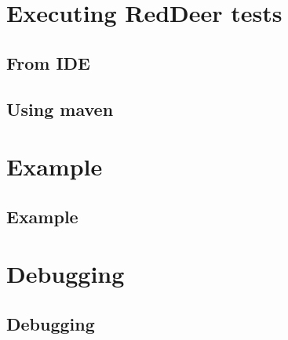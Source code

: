 \documentclass{beamer}
\begin{document}
\section{Executing RedDeer tests}
\subsection{From IDE}
\subsection{Using maven}


\section{Example}
\subsection{Example}

\section{Debugging}
\subsection{Debugging}
\end{document}

